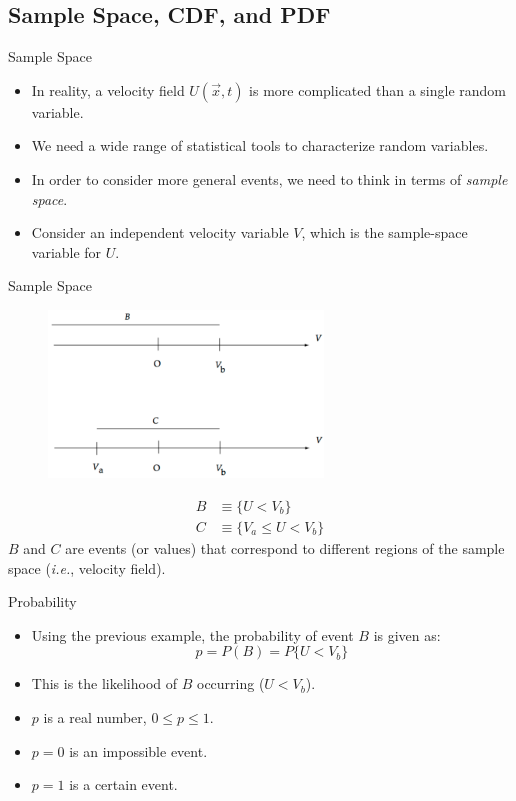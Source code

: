 \subsection{Sample Space, CDF, and PDF}
\begin{frame}{Sample Space}
\begin{itemize}
  	\item In reality, a velocity field $U(\vec{x},t)$ is more complicated than a single random variable.
  	\item We need a wide range of statistical tools to characterize random variables.
  	\item In order to consider more general events, we need to think in terms of \textit{sample space}.
  	\item Consider an independent velocity variable $V$, which is the sample-space variable for $U$.
  \end{itemize}
\end{frame}


\begin{frame}{Sample Space}
  \begin{figure}[H]
  \centering
  \includegraphics[width=0.65\textwidth]{samplespace.png}
  \end{figure}
  \begin{align*}
  B &\equiv \{U < V_b \}\\C &\equiv \{V_a \leq U < V_b \}
  \end{align*}
  $B$ and $C$ are events (or values) that correspond to different regions of the sample space (\textit{i.e.}, velocity field).
  
\end{frame}


\begin{frame}{Probability}
\begin{itemize}
  	\item Using the previous example, the probability of event $B$ is given as:
  	$$p=P(B)=P\{U<V_b\}$$
  	\item This is the likelihood of $B$ occurring ($U<V_b$).
  	\item $p$ is a real number, $0 \leq p \leq 1$.
  	\item $p = 0$ is an impossible event.
  	\item $p = 1$ is a certain event.
  \end{itemize}
\end{frame}

